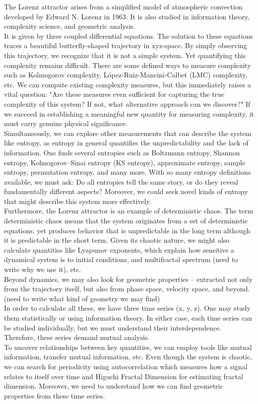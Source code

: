 \documentclass[%
 reprint,
 amsmath,amssymb,
 aps,
 floatfix,
]{revtex4-2}
\begin{document}
The Lorenz attractor arises from a simplified model of atmospheric convection developed by Edward N. Lorenz in 1963. It is also studied in information theory, complexity science, and geometric analysis.\\
It is given by three coupled differential equations. The solution to these equations traces a beautiful butterfly-shaped trajectory in xyz-space. By simply observing this trajectory, we recognize that it is not a simple system. Yet quantifying this complexity remains difficult. There are some defined ways to measure complexity such as Kolmogorov complexity, López-Ruiz-Mancini-Calbet (LMC) complexity, etc. 
We can compute existing complexity measures, but this immediately raises a vital question: "Are these measures even sufficient for capturing the true complexity of this system? If not, what alternative approach can we discover?"
If we succeed in establishing a meaningful new quantity for measuring complexity, it must carry genuine physical significance.\\
Simultaneously, we can explore other measurements that can describe the system like entropy, as entropy in general quantifies the unpredictability and the lack of information. One finds several entropies such as Boltzmann entropy, Shannon entropy, Kolmogorov–Sinai entropy (KS entropy), approximate entropy, sample entropy, permutation entropy, and many more. With so many entropy definitions available, we must ask: Do all entropies tell the same story, or do they reveal fundamentally different aspects? Moreover, we could seek novel kinds of entropy that might describe this system more effectively.\\
Furthermore, the Lorenz attractor is an example of deterministic chaos. The term deterministic chaos means that the system originates from a set of deterministic equations, yet produces behavior that is unpredictable in the long term although it is predictable in the short term. Given its chaotic nature, we might also calculate quantities like Lyapunov exponents, which explain how sensitive a dynamical system is to initial conditions, and multifractal spectrum (need to write why we use it), etc.\\
Beyond dynamics, we may also look for geometric properties – extracted not only from the trajectory itself, but also from phase space, velocity space, and beyond. (need to write what kind of geometry we may find)\\
In order to calculate all these, we have three time series (x, y, z). One may study them statistically or using information theory. In either case, each time series can be studied individually, but we must understand their interdependence. Therefore, these series demand mutual analysis.\\
To uncover relationships between key quantities, we can employ tools like mutual information, transfer mutual information, etc. Even though the system is chaotic, we can search for periodicity using autocorrelation which measures how a signal relates to itself over time and Higuchi Fractal Dimension for estimating fractal dimension. Moreover, we need to understand how we can find geometric properties from these time series.
\end{document}
